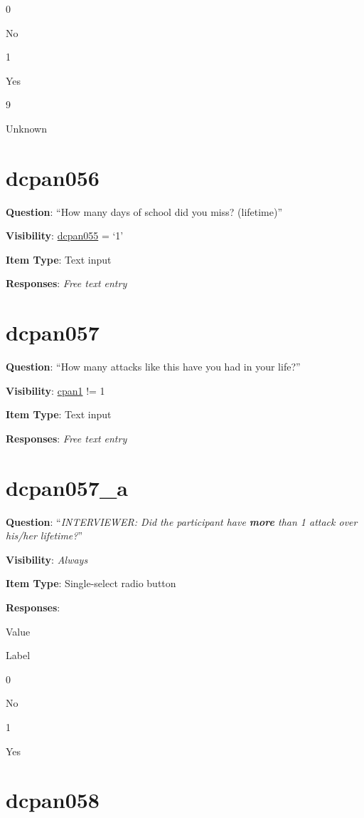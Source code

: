 \documentclass[]{book}
\begin{document}
0

No

1

Yes

9

Unknown

\hypertarget{dcpan056}{%
\section{dcpan056}\label{dcpan056}}

\textbf{Question}: ``How many days of school did you miss? (lifetime)''

\textbf{Visibility}: \protect\hyperlink{dcpan055}{dcpan055} = `1'

\textbf{Item Type}: Text input

\textbf{Responses}: \emph{Free text entry}

\hypertarget{dcpan057}{%
\section{dcpan057}\label{dcpan057}}

\textbf{Question}: ``How many attacks like this have you had in your life?''

\textbf{Visibility}: \protect\hyperlink{cpan1}{cpan1} != 1

\textbf{Item Type}: Text input

\textbf{Responses}: \emph{Free text entry}

\hypertarget{dcpan057_a}{%
\section{dcpan057\_a}\label{dcpan057_a}}

\textbf{Question}: ``\emph{INTERVIEWER: Did the participant have \textbf{more} than 1 attack over his/her lifetime?}''

\textbf{Visibility}: \emph{Always}

\textbf{Item Type}: Single-select radio button

\textbf{Responses}:

Value

Label

0

No

1

Yes

\hypertarget{dcpan058}{%
\section{dcpan058}\label{dcpan058}}
\end{document}
